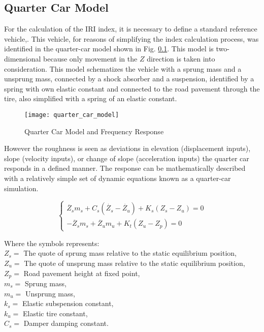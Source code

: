 \documentclass{standalone}
\begin{document}
\subsection{Quarter Car Model}\label{Quarter Car Model}
For the calculation of the IRI index, it is necessary to define a standard reference vehicle,\cite{little_book}. This vehicle, for reasons of simplifying the index calculation process, was identified in the quarter-car model shown in Fig. \ref{Quarter Car Model}. This model is two-dimensional because only
movement in the $Z$ direction is taken into consideration. This model schematizes the vehicle with a sprung mass and a unsprung mass, connected by a shock absorber and a suspension, identified by a spring with own elastic constant and connected to the road pavement through the tire, also simplified with a spring of an elastic constant\cite{little_book}.

\begin{figure}[ht]
\centering
\texttt{[image: quarter\_car\_model]}
\caption{Quarter Car Model and Frequency Response}

\label{fig:Quarter Car Model}
\end{figure}



 \noindent \cite{gillespie1992everything}However the roughness is seen as deviations in elevation (displacement inputs), slope (velocity inputs), or change of slope (acceleration inputs) the quarter car responds in a defined manner. The response can be mathematically described with a relatively simple set
of dynamic equations known as a quarter-car simulation.


\begin{center}

\[
    \left\{
                \begin{array}{ll}
                  \ddot{Z_{s}} m_{s} + C_{s} ( \dot{Z_{s}} - \dot{Z_{u}} ) + K_{s} (Z_{s} - Z_{u}) = 0\\
                  - \ddot{Z_{s}} m_{s} + \ddot{Z_{u}} m_{u} + K_{t} ( Z_{u} - Z_{p} ) = 0
                \end{array}
              \right.
\]




\end{center}

\noindent Where the symbols represents:
\\
$ Z_{s} =  $ The quote of sprung mass relative to the static equilibrium position,	\\
$ Z_{u} =  $ The quote of unsprung mass relative to the static equilibrium position,\\
$ Z_{p} = $ Road pavement height at fixed point,\\
$ m_{s} = $ Sprung mass,	\\
$ m_{u} = $ Unsprung mass, \\
$ k_{s} = $ Elastic subspension constant, \\
$ k_{u} = $ Elastic tire constant, \\
$C_{s} = $ Damper damping constant.\\
\end{document}

